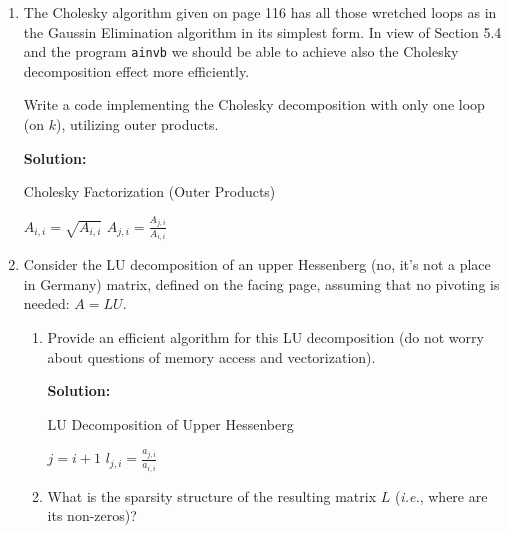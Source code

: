 \documentclass[12pt]{article}
\begin{document}
\begin{enumerate}
\item The Cholesky algorithm given on page 116 has all those wretched loops as in the Gaussin Elimination
algorithm in its simplest form. In view of Section 5.4 and the program {\tt ainvb} we should be able to
achieve also the Cholesky decomposition effect more efficiently.

Write a code implementing the Cholesky decomposition with only one loop (on $k$), utilizing outer products.

{\bf Solution:}

\begin{algorithm}[H]
\caption{Cholesky Factorization (Outer Products)}
\begin{algorithmic}[1]
    \STATE $A_{i,i} = \sqrt{A_{i,i}}$
      \STATE $A_{j,i} = \frac{A_{j,i}}{A_{i,i}}$
    \ENDFOR
      \ENDFOR
    \ENDFOR
\ENDFOR
\end{algorithmic}
\label{alg:chol}
\end{algorithm}

\item Consider the LU decomposition of an upper Hessenberg (no, it's not a place in Germany) matrix,
defined on the facing page, assuming that no pivoting is needed: $A = LU$.

\begin{enumerate}
\item Provide an efficient algorithm for this LU decomposition (do not worry about questions of memory access and vectorization).

{\bf Solution:}

\begin{algorithm}[H]
\caption{LU Decomposition of Upper Hessenberg}
\begin{algorithmic}[1]
\STATE $j = i+1$
\STATE $l_{j,i} = \frac{a_{j,i}}{a_{i,i}}$
\ENDFOR
\ENDFOR
\end{algorithmic}
\label{alg:lu_hess}
\end{algorithm}

\item What is the sparsity structure of the resulting matrix $L$ ({\em i.e.}, where are its non-zeros)?


\end{enumerate}
\end{enumerate}
\end{document}
